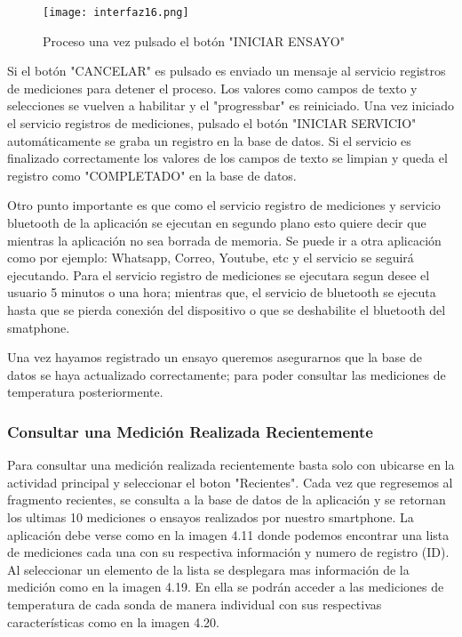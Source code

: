 \begin{figure}[H]
	\centering
	\texttt{[image: interfaz16.png]}
	\caption{Proceso una vez pulsado el botón "INICIAR ENSAYO"}
\end{figure}
 
\par \noindent
Si el botón "CANCELAR" es pulsado es enviado un mensaje al servicio registros de mediciones para detener el proceso. Los valores como campos de texto y selecciones se vuelven a habilitar y el "progressbar" es reiniciado. Una vez iniciado el servicio registros de mediciones, pulsado el botón "INICIAR SERVICIO" automáticamente se graba un registro en la base de datos. Si el servicio es finalizado correctamente los valores de los campos de texto se limpian y queda el registro como "COMPLETADO" en la base de datos. 

\par \noindent
Otro punto importante es que como el servicio registro de mediciones y servicio bluetooth de la aplicación se ejecutan en segundo plano esto quiere decir que mientras la aplicación no sea borrada de memoria. Se puede ir a otra aplicación como por ejemplo: Whatsapp, Correo, Youtube, etc y el servicio se seguirá ejecutando. Para el servicio registro de mediciones se ejecutara segun desee el usuario 5 minutos o una hora; mientras que, el servicio de bluetooth se ejecuta hasta que se pierda conexión del dispositivo o que se deshabilite el bluetooth del smatphone.

\par \noindent
Una vez hayamos registrado un ensayo queremos asegurarnos que la base de datos se haya actualizado correctamente; para poder consultar las mediciones de temperatura posteriormente.

\subsubsection{Consultar una Medición Realizada Recientemente}

\par 
Para consultar una medición realizada recientemente basta solo con ubicarse en la actividad principal y seleccionar el boton "Recientes". Cada vez que regresemos al fragmento recientes, se consulta a la base de datos de la aplicación y se retornan los ultimas 10 mediciones o ensayos realizados por nuestro smartphone. La aplicación debe verse como en la imagen 4.11 donde podemos encontrar una lista de mediciones cada una con su respectiva información y numero de registro (ID). Al seleccionar un elemento de la lista se desplegara mas información de la medición como en la imagen 4.19. En ella se podrán acceder a las mediciones de temperatura de cada sonda de manera individual con sus respectivas características como en la imagen 4.20.

